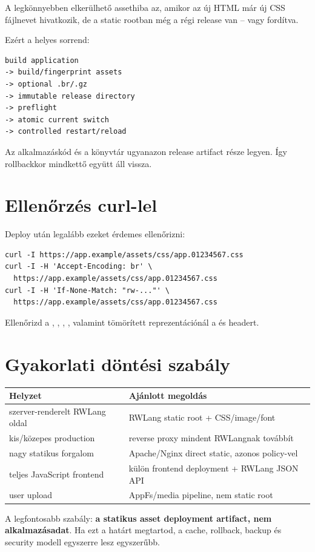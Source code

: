 A legkönnyebben elkerülhető assethiba az, amikor az új HTML már új CSS fájlnevet hivatkozik, de a static rootban még a régi release van -- vagy fordítva.

Ezért a helyes sorrend:

\begin{lstlisting}
build application
-> build/fingerprint assets
-> optional .br/.gz
-> immutable release directory
-> preflight
-> atomic current switch
-> controlled restart/reload
\end{lstlisting}

Az alkalmazáskód és a  könyvtár ugyanazon release artifact része legyen. Így rollbackkor mindkettő együtt áll vissza.

\section{Ellenőrzés curl-lel}

Deploy után legalább ezeket érdemes ellenőrizni:

\begin{lstlisting}
curl -I https://app.example/assets/css/app.01234567.css
curl -I -H 'Accept-Encoding: br' \
  https://app.example/assets/css/app.01234567.css
curl -I -H 'If-None-Match: "rw-..."' \
  https://app.example/assets/css/app.01234567.css
\end{lstlisting}

Ellenőrizd a , , , , valamint tömörített reprezentációnál a  és  headert.

\section{Gyakorlati döntési szabály}

\begin{center}
\begin{tabularx}{\textwidth}{@{}lY@{}}
\toprule
Helyzet & Ajánlott megoldás \\
\midrule
szerver-renderelt RWLang oldal & RWLang static root + CSS/image/font \\
kis/közepes production & reverse proxy mindent RWLangnak továbbít \\
nagy statikus forgalom & Apache/Nginx direct static, azonos policy-vel \\
teljes JavaScript frontend & külön frontend deployment + RWLang JSON API \\
user upload & AppFs/media pipeline, nem static root \\
\bottomrule
\end{tabularx}
\end{center}

A legfontosabb szabály: \textbf{a statikus asset deployment artifact, nem alkalmazásadat}. Ha ezt a határt megtartod, a cache, rollback, backup és security modell egyszerre lesz egyszerűbb.
